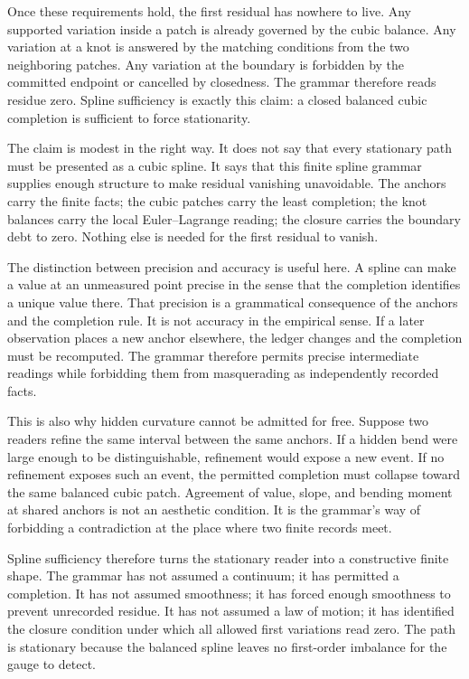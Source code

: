 Once these requirements hold, the first residual has nowhere to live. Any
supported variation inside a patch is already governed by the cubic
balance. Any variation at a knot is answered by the matching conditions
from the two neighboring patches. Any variation at the boundary is
forbidden by the committed endpoint or cancelled by closedness. The grammar
therefore reads residue zero. Spline sufficiency is exactly this claim: a
closed balanced cubic completion is sufficient to force stationarity.

The claim is modest in the right way. It does not say that every stationary
path must be presented as a cubic spline. It says that this finite spline
grammar supplies enough structure to make residual vanishing unavoidable.
The anchors carry the finite facts; the cubic patches carry the least
completion; the knot balances carry the local Euler--Lagrange reading; the
closure carries the boundary debt to zero. Nothing else is needed for the
first residual to vanish.

The distinction between precision and accuracy is useful here. A spline can
make a value at an unmeasured point precise in the sense that the completion
identifies a unique value there. That precision is a grammatical
consequence of the anchors and the completion rule. It is not accuracy in
the empirical sense. If a later observation places a new anchor elsewhere,
the ledger changes and the completion must be recomputed. The grammar
therefore permits precise intermediate readings while forbidding them from
masquerading as independently recorded facts.

This is also why hidden curvature cannot be admitted for free. Suppose two
readers refine the same interval between the same anchors. If a hidden bend
were large enough to be distinguishable, refinement would expose a new
event. If no refinement exposes such an event, the permitted completion
must collapse toward the same balanced cubic patch. Agreement of value,
slope, and bending moment at shared anchors is not an aesthetic condition.
It is the grammar's way of forbidding a contradiction at the place where
two finite records meet.

Spline sufficiency therefore turns the stationary reader into a constructive
finite shape. The grammar has not assumed a continuum; it has permitted a
completion. It has not assumed smoothness; it has forced enough smoothness
to prevent unrecorded residue. It has not assumed a law of motion; it has
identified the closure condition under which all allowed first variations
read zero. The path is stationary because the balanced spline leaves no
first-order imbalance for the gauge to detect.

